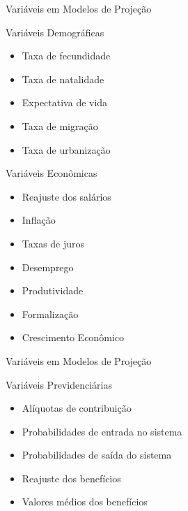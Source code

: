 \begin{frame}{Variáveis em Modelos de Projeção}
\scriptsize
  \begin{block}{Variáveis Demográficas}
    \begin{itemize}
      \item Taxa de fecundidade
      \item Taxa de natalidade
      \item Expectativa de vida
      \item Taxa de migração
      \item Taxa de urbanização
    \end{itemize}
  \end{block}
  \pause
  \begin{block}{Variáveis Econômicas}
    \begin{itemize}
      \item Reajuste dos salários
      \item Inflação
      \item Taxas de juros
      \item Desemprego
      \item Produtividade
      \item Formalização
      \item Crescimento Econômico
    \end{itemize}
  \end{block}
\end{frame}

\begin{frame}{Variáveis em Modelos de Projeção}
  \begin{block}{Variáveis Previdenciárias}
    \begin{itemize}
      \item Alíquotas de contribuição
      \item Probabilidades de entrada no sistema
      \item Probabilidades de saída do sistema
      \item Reajuste dos benefícios
      \item Valores médios dos benefícios
    \end{itemize}
  \end{block}
\end{frame}

